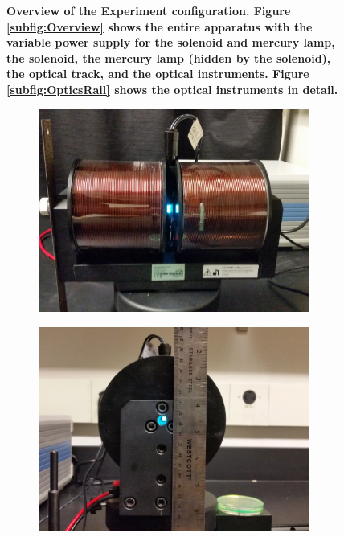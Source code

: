 \documentclass[twocolumn]{article}
\begin{document}
\begin{figure}
\begin{subfigure}{0.5\textwidth}
		\end{subfigure}%
		\caption{\textbf{Overview of the Experiment configuration. Figure \ref{subfig:Overview} shows the entire apparatus with the variable power supply for the solenoid and mercury lamp, the solenoid, the mercury lamp (hidden by the solenoid), the optical track, and the optical instruments. Figure \ref{subfig:OpticsRail} shows the optical instruments in detail.}}
		\label{fig:ContextView}
	\end{figure}
	
	\begin{figure}
		\centering
		\begin{subfigure}{0.5\textwidth}
			\includegraphics[width = 0.98\textwidth]{Images/PerpendicularView.jpg}
			\caption{}
			\label{subfig:PerpView}
		\end{subfigure}%
		\begin{subfigure}{0.5\textwidth}
			\includegraphics[width = 0.98\textwidth]{Images/AxialView.jpg}

\end{subfigure}
\end{figure}
\end{document}

